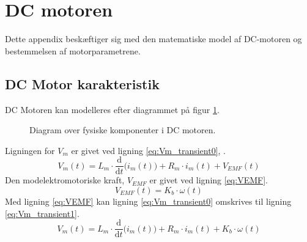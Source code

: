 \section{DC motoren}
\label{sec:dcmotor}
Dette appendix beskæftiger sig med den matematiske model af DC-motoren og bestemmelsen af motorparametrene.
\subsection{DC Motor karakteristik}
DC Motoren kan modelleres efter diagrammet på figur \ref{fig:DCmotor}. 

\begin{figure}[!th]
\centering
\begin{circuitikz}
  
\end{circuitikz}
\caption[DC motor]{Diagram over fysiske komponenter i DC motoren.}
\label{fig:DCmotor}
\end{figure}
Ligningen for \(V_m\) er givet ved ligning \ref{eq:Vm_transient0}, \citep{DCmotormodel}.
\begin{equation}
	V_m\left(t\right)=L_m \cdot \frac{\mathrm d}{\mathrm d t} \big( i_m\left(t\right) \big)+R_m \cdot i_m\left(t\right) + V_{EMF}\left(t\right)
	\label{eq:Vm_transient0} 
 \end{equation}
Den modelektromotoriske kraft, \(V_{EMF}\) er givet ved ligning \ref{eq:VEMF}.
\begin{equation}
	V_{EMF}\left(t\right) = K_b \cdot \omega\left(t\right)
	\label{eq:VEMF}
\end{equation}
Med ligning \ref{eq:VEMF} kan ligning \ref{eq:Vm_transient0} omskrives til ligning \ref{eq:Vm_transient1}.
\begin{equation}
	V_m\left(t\right)=L_m \cdot \frac{\mathrm d}{\mathrm d t} \big( i_m\left(t\right) \big)+R_m \cdot i_m\left(t\right) +K_b \cdot \omega\left(t\right)
	\label{eq:Vm_transient1} 
 \end{equation}

